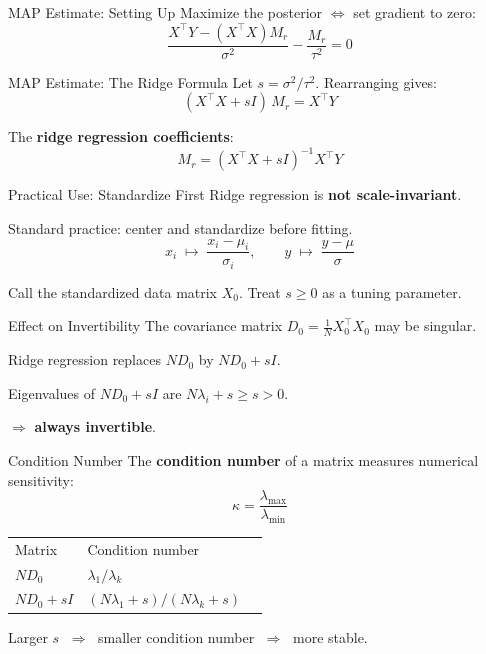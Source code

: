 \documentclass{beamer}
\begin{document}
\begin{frame}{MAP Estimate: Setting Up}
Maximize the posterior $\Leftrightarrow$ set gradient to zero:
\[
  \frac{X^\intercal Y - (X^\intercal X)M_r}{\sigma^2} - \frac{M_r}{\tau^2} = 0
\]
\end{frame}

\begin{frame}{MAP Estimate: The Ridge Formula}
Let $s = \sigma^2/\tau^2$. Rearranging gives:
\[
  (X^\intercal X + sI)\, M_r = X^\intercal Y
\]

\bigskip
The \textbf{ridge regression coefficients}:
\[
  \boxed{M_r = (X^\intercal X + sI)^{-1} X^\intercal Y}
\]
\end{frame}

\begin{frame}{Practical Use: Standardize First}
Ridge regression is \textbf{not scale-invariant}.

\bigskip
Standard practice: center and standardize before fitting.
\[
  x_i \;\mapsto\; \frac{x_i - \mu_i}{\sigma_i}, \qquad
  y \;\mapsto\; \frac{y - \mu}{\sigma}
\]

\bigskip
Call the standardized data matrix $X_0$. Treat $s \geq 0$ as a tuning parameter.
\end{frame}

\begin{frame}{Effect on Invertibility}
The covariance matrix $D_0 = \tfrac{1}{N}X_0^\intercal X_0$ may be singular.

\bigskip
Ridge regression replaces $ND_0$ by $ND_0 + sI$.

\bigskip
Eigenvalues of $ND_0 + sI$ are $N\lambda_i + s \geq s > 0$.

\bigskip
$\Rightarrow$ \textbf{always invertible}.
\end{frame}

\begin{frame}{Condition Number}
The \textbf{condition number} of a matrix measures numerical sensitivity:
\[
  \kappa = \frac{\lambda_{\max}}{\lambda_{\min}}
\]

\bigskip
\begin{tabular}{lll}
  Matrix & Condition number \\[4pt]
  $ND_0$ & $\lambda_1/\lambda_k$ \\[6pt]
  $ND_0 + sI$ & $(N\lambda_1+s)/(N\lambda_k+s)$
\end{tabular}

\bigskip
Larger $s$ $\;\Rightarrow\;$ smaller condition number $\;\Rightarrow\;$ more stable.
\end{frame}
\end{document}
